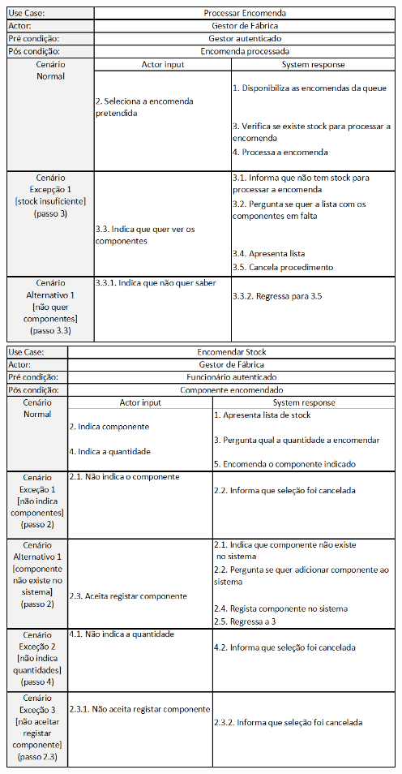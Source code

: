 \documentclass[11pt]{article} %
\begin{document}
\begin{enumerate}
\begin{center}
	\end{center}
	\begin{center}
 		\includegraphics[width = 5in]{gf_processarencomenda.png} 
		\includegraphics[width = 5in]{gf_encomendarstock.png} 

\end{center}
\end{enumerate}
\end{document}
